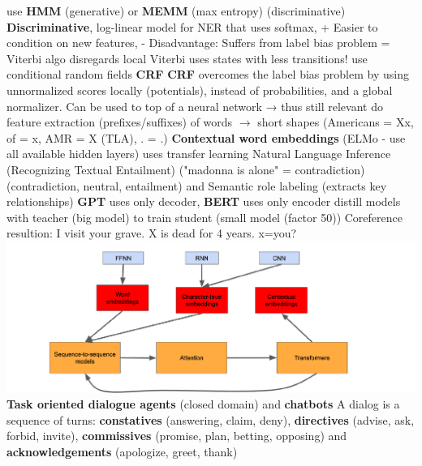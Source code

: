 \documentclass[8pt]{extarticle}
\begin{document}
\begin{multicols*}{3}
\newline use \textbf{HMM} (generative) or \textbf{MEMM} (max entropy) (discriminative)
\newline \textbf{Discriminative}, log-linear model for NER that uses softmax, + Easier to condition on new features, - Disadvantage: Suffers from label bias problem = Viterbi algo disregards local
\newline Viterbi uses states with less transitions!
\newline use conditional random fields \textbf{CRF}
\newline \textbf{CRF} overcomes the label bias problem by using unnormalized scores locally (potentials),
instead of probabilities, and a global normalizer. Can be used to top of a neural network → thus still relevant
\newline do feature extraction (prefixes/suffixes) of words $\rightarrow$ short shapes (Americans = Xx, of = x, AMR = X (TLA), . = .)
\newline \textbf{Contextual word embeddings} (ELMo - use all available hidden layers) uses transfer learning
\newline Natural Language Inference (Recognizing Textual Entailment) ("madonna is alone" = contradiction) (contradiction, neutral, entailment) and Semantic role labeling (extracts key relationships)
\newline \textbf{GPT} uses only decoder, \textbf{BERT} uses only encoder
\newline distill models with teacher (big model) to train student (small model (factor 50))
\newline Coreference resultion: I visit your grave. X is dead for 4 years. x=you?
\includegraphics[width=\columnwidth]{models}
\textbf{Task oriented dialogue agents} (closed domain) and \textbf{chatbots}
\newline A dialog is a sequence of turns: \textbf{constatives} (answering, claim, deny), \textbf{directives} (advise, ask, forbid, invite), \textbf{commissives} (promise, plan, betting, opposing) and \textbf{acknowledgements} (apologize, greet, thank)

\end{multicols*}
\end{document}
